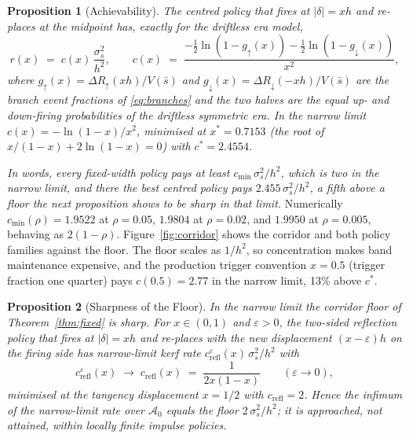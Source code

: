 \documentclass[11pt,a4paper]{article}
\theoremstyle{definition}
\theoremstyle{plain}
\newtheorem{proposition}{Proposition}
\theoremstyle{remark}
\begin{document}
\begin{proposition}[Achievability]\label{prop:achieve}
The centred policy that fires at $|\delta| = x h$ and re-places at the midpoint has, exactly for the driftless era model,
\begin{equation}\label{eq:cx}
r(x) \;=\; c(x)\,\frac{\sigma_s^2}{h^2}, \qquad
c(x) \;=\; \frac{-\tfrac12 \ln(1 - g_{\uparrow}(x)) - \tfrac12
\ln(1 - g_{\downarrow}(x))}{x^2},
\end{equation}
where $g_{\uparrow}(x) = \Delta R_{\uparrow}(xh)/V(\bar s)$ and $g_{\downarrow}(x) = \Delta R_{\downarrow}(-xh)/V(\bar s)$ are the branch event fractions of \eqref{eq:branches} and the two halves are
the equal up- and down-firing probabilities of the driftless symmetric era. In the narrow limit $c(x) = -\ln(1-x)/x^2$, minimised at $x^* = 0.7153$ (the root of $x/(1-x) + 2\ln(1-x) = 0$) with $c^* = 2.4554$.
\end{proposition}

\emph{In words, every fixed-width policy pays at least $c_{\min}\,\sigma_s^2/h^2$, which is two in the narrow limit, and there the best centred policy pays $2.455\,\sigma_s^2/h^2$, a fifth
above a floor the next proposition shows to be sharp in that limit.}
Numerically $c_{\min}(\rho) = 1.9522$ at $\rho = 0.05$, $1.9804$ at $\rho = 0.02$, and $1.9950$ at $\rho = 0.005$, behaving as $2(1 - \rho)$. Figure~\ref{fig:corridor}
shows the corridor and both policy families against the floor. The floor scales as $1/h^2$, so concentration makes band maintenance expensive, and the production trigger convention $x = 0.5$ (trigger
fraction one quarter\cite{ryan2026omqm}) pays $c(0.5) = 2.77$ in the narrow limit, 13\% above $c^*$.

\begin{proposition}[Sharpness of the Floor]\label{prop:sharp}
In the narrow limit the corridor floor of Theorem~\ref{thm:fixed} is sharp. For $x \in (0, 1)$ and $\varepsilon > 0$, the two-sided reflection policy that fires at $|\delta| = xh$ and re-places with
the new displacement $(x - \varepsilon)h$ on the firing side has narrow-limit kerf rate
$c^{\varepsilon}_{\mathrm{refl}}(x)\,\sigma_s^2/h^2$ with
\begin{equation}\label{eq:crefl}
c^{\varepsilon}_{\mathrm{refl}}(x) \;\longrightarrow\;
c_{\mathrm{refl}}(x) \;=\; \frac{1}{2x(1-x)}
\qquad (\varepsilon \to 0),
\end{equation}
minimised at the tangency displacement $x = 1/2$ with $c_{\mathrm{refl}} = 2$. Hence the infimum of the narrow-limit rate over $\mathcal{A}_0$ equals the floor $2\,\sigma_s^2/h^2$; it is
approached, not attained, within locally finite impulse policies.
\end{proposition}
\end{document}

